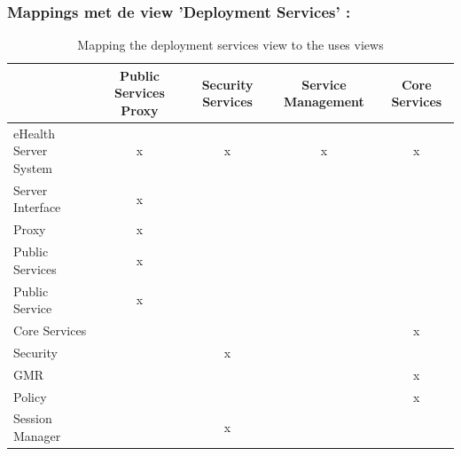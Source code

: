 \documentclass[a4paper,10pt]{article}
\begin{document}
\subsubsection{Mappings met de view 'Deployment Services' : }
\begin{table}[h!]
\begin{center}
 \begin{tabular}{l| c | c | c | c |} 
 & Public Services Proxy & Security Services & Service Management & Core Services \\ \hline
eHealth Server System & x & x & x & x \\ \hline
\hspace{6pt}Server Interface & x & & & \\ \hline
\hspace{12pt}Proxy & x & & & \\ \hline
\hspace{6pt}Public Services & x & & & \\ \hline
\hspace{12pt}Public Service & x & & & \\ \hline
\hspace{6pt}Core Services & & & & x \\ \hline
\hspace{12pt}Security & & x & & \\ \hline
\hspace{12pt}GMR & & & & x \\ \hline
\hspace{12pt}Policy & & & & x \\ \hline
\hspace{12pt}Session Manager & & x & & \\ \hline
\end{tabular}
\caption{Mapping the deployment services view to the uses views}
\end{center}
\end{table}
\end{document}
